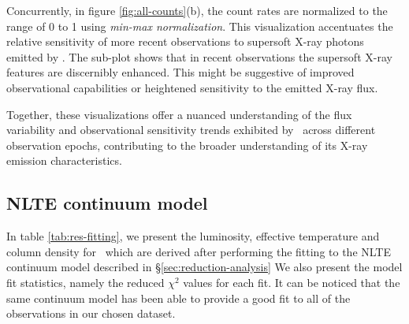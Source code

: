     Concurrently, in figure \ref{fig:all-counts}(b), the count rates are normalized to the range of 0 to 1 using \textit{min-max normalization}. This visualization accentuates the relative sensitivity of more recent observations to supersoft X-ray photons emitted by \source. The sub-plot shows that in recent observations the supersoft X-ray features are discernibly enhanced. This might be suggestive of improved observational capabilities or heightened sensitivity to the emitted X-ray flux.
    
    Together, these visualizations offer a nuanced understanding of the flux variability and observational sensitivity trends exhibited by \source\ across different observation epochs, contributing to the broader understanding of its X-ray emission characteristics.
    
    \subsection{NLTE continuum model}
    In table \ref{tab:res-fitting}, we present the luminosity, effective temperature and column density for \source\ which are derived after performing the fitting to the NLTE continuum model described in \S \ref{sec:reduction-analysis} We also present the model fit statistics, namely the reduced $\chi^2$ values for each fit. It can be noticed that the same continuum model has been able to provide a good fit to all of the observations in our chosen dataset.
